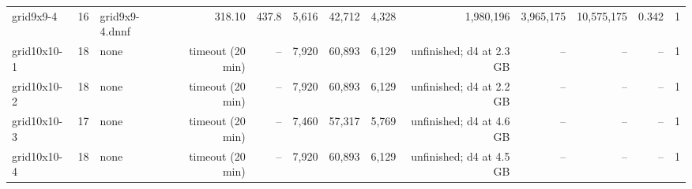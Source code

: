 \documentclass[10pt]{article}
\begin{document}
\begin{lrbox}{\tbl}
\begin{tabular}{lrlrrrrrrrrrr}
grid9x9-4 & 16 & grid9x9-4.dnnf & 318.10 & 437.8 & 5,616 & 42,712 & 4,328 & 1,980,196 & 3,965,175 & 10,575,175 & 0.342 & 1 \\
grid10x10-1 & 18 & none & timeout (20 min) & -- & 7,920 & 60,893 & 6,129 & unfinished; d4 at 2.3 GB & -- & -- & -- & 1 \\
grid10x10-2 & 18 & none & timeout (20 min) & -- & 7,920 & 60,893 & 6,129 & unfinished; d4 at 2.2 GB & -- & -- & -- & 1 \\
grid10x10-3 & 17 & none & timeout (20 min) & -- & 7,460 & 57,317 & 5,769 & unfinished; d4 at 4.6 GB & -- & -- & -- & 1 \\
grid10x10-4 & 18 & none & timeout (20 min) & -- & 7,920 & 60,893 & 6,129 & unfinished; d4 at 4.5 GB & -- & -- & -- & 1 \\
\bottomrule
\end{tabular}\end{lrbox}
\noindent{}
\par\bigskip\noindent
\end{document}
